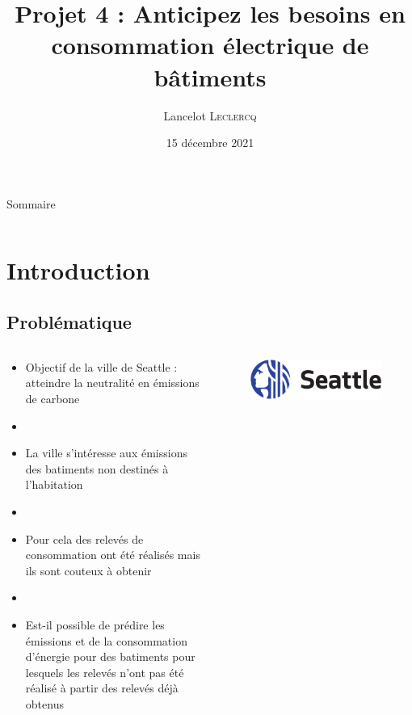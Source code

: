 \documentclass[8pt,aspectratio=169,hyperref={unicode=true}]{beamer}
\title[Anticipez les besoins en consommation électrique de bâtiments]
{Projet 4 : Anticipez les besoins en consommation électrique de bâtiments}
\author[Lancelot \textsc{Leclercq}]{Lancelot \textsc{Leclercq}}
\institute[]{}
\date[]{\small{15 décembre 2021}}
\begin{document}
\begin{frame}[plain]
  \titlepage
\end{frame}

\begin{frame}{Sommaire}
  \Large
  \begin{columns}
    \begin{column}{.7\textwidth}
      \tableofcontents[hideallsubsections]
    \end{column}
  \end{columns}
\end{frame}


\section{Introduction}
\subsection{Problématique}
\begin{frame}{\insertsubsection}
  \begin{columns}
    \begin{column}{.6\textwidth}
      \begin{itemize}
        \item Objectif de la ville de Seattle : atteindre la neutralité en émissions
              de carbone
        \item[]
        \item La ville s'intéresse aux émissions des batiments non destinés
              à l'habitation
        \item[]
        \item Pour cela des relevés de consommation ont été réalisés mais ils sont
              couteux à obtenir
        \item[]
        \item Est-il possible de prédire les émissions et de la consommation d'énergie
              pour des batiments pour lesquels les relevés n'ont pas été réalisé à partir
              des relevés déjà obtenus
      \end{itemize}
    \end{column}
    \begin{column}{.4\textwidth}
      \begin{figure}
        \includegraphics[width=.8\textwidth]{./Seattle_logo_landscape_blue-black.pdf}
      \end{figure}
    \end{column}
  \end{columns}
\end{frame}
\end{document}
